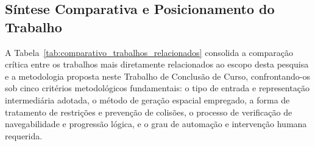 \newpage
\subsection{Síntese Comparativa e Posicionamento do Trabalho}
\label{sec:relacionados_sintese}

A Tabela~\ref{tab:comparativo_trabalhos_relacionados} consolida a comparação crítica entre os trabalhos mais diretamente relacionados ao escopo desta pesquisa e a metodologia proposta neste Trabalho de Conclusão de Curso, confrontando-os sob cinco critérios metodológicos fundamentais: o tipo de entrada e representação intermediária adotada, o método de geração espacial empregado, a forma de tratamento de restrições e prevenção de colisões, o processo de verificação de navegabilidade e progressão lógica, e o grau de automação e intervenção humana requerida.

